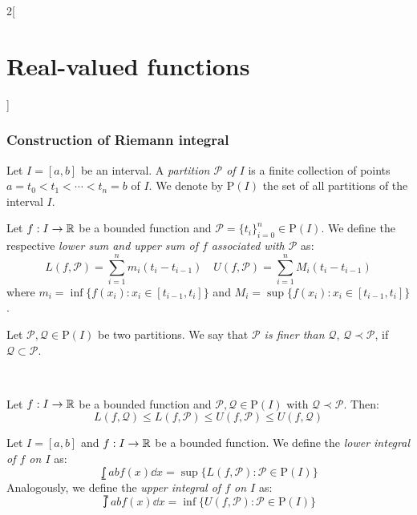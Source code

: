 \documentclass[../../../main.tex]{subfiles}
\begin{document}
\begin{multicols}{2}[\section{Real-valued functions}]
    \subsubsection*{Construction of Riemann integral}
    \begin{definition}
        Let $I=[a,b]$ be an interval. A \textit{partition $\mathcal{P}$ of $I$} is a finite collection of points $a=t_0<t_1<\cdots<t_n=b$ of $I$. We denote by $\mathrm{P}(I)$ the set of all partitions of the interval $I$.
    \end{definition}
    \begin{definition}
        Let $f:I\rightarrow\mathbb{R}$ be a bounded function and $\mathcal{P}=\{t_i\}_{i=0}^n\in\mathrm{P}(I)$. We define the respective \textit{lower sum and upper sum of $f$ associated with $\mathcal{P}$} as:
        $$L(f,\mathcal{P})=\sum_{i=1}^nm_i(t_i-t_{i-1})\quad U(f,\mathcal{P})=\sum_{i=1}^nM_i(t_i-t_{i-1})$$
        where $m_i=\inf\{f(x_i):x_i\in[t_{i-1},t_i]\}$ and $M_i=\sup\{f(x_i):x_i\in[t_{i-1},t_i]\}$.
    \end{definition}
    \begin{definition}
        Let $\mathcal{P},\mathcal{Q}\in\mathrm{P}(I)$ be two partitions. We say that \textit{$\mathcal{P}$ is finer than $\mathcal{Q}$}, $\mathcal{Q}\prec\mathcal{P}$, if $\mathcal{Q}\subset\mathcal{P}$.
    \end{definition}
    \begin{center}
        \begin{minipage}{\linewidth}
            \centering
            \\
            
        \end{minipage}
    \end{center}
    \begin{prop}
        Let $f:I\rightarrow\mathbb{R}$ be a bounded function and $\mathcal{P},\mathcal{Q}\in\mathrm{P}(I)$ with $\mathcal{Q}\prec\mathcal{P}$. Then: $$L(f,\mathcal{Q})\leq L(f,\mathcal{P})\leq U(f,\mathcal{P})\leq U(f,\mathcal{Q})$$
    \end{prop}
    \begin{definition}
        Let $I=[a,b]$ and $f:I\rightarrow\mathbb{R}$ be a bounded function. We define the \textit{lower integral of $f$ on $I$} as: $$\lowint{a}{b}f(x)\dd x=\sup\{L(f,\mathcal{P}):\mathcal{P}\in\mathrm{P}(I)\}$$ Analogously, we define the \textit{upper integral of $f$ on $I$} as: $$\upint{a}{b}f(x)\dd x=\inf\{U(f,\mathcal{P}):\mathcal{P}\in\mathrm{P}(I)\}$$

\end{definition}
\end{multicols}
\end{document}
